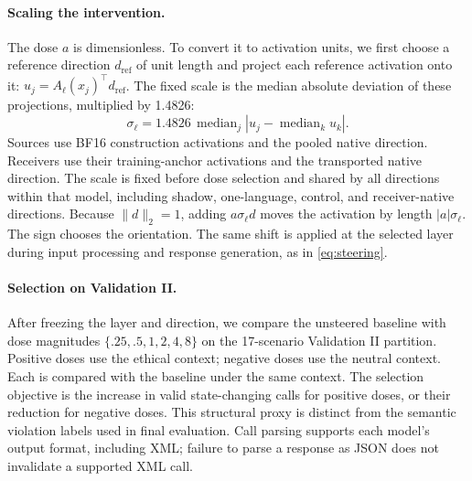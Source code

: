 \paragraph{Scaling the intervention.}
The dose $a$ is dimensionless. To convert it to activation units, we first
choose a reference direction $d_{\mathrm{ref}}$ of unit length and project
each reference activation onto it: $u_j=A_\ell(x_j)^\top d_{\mathrm{ref}}$.
The fixed scale is the median absolute deviation of these projections,
multiplied by 1.4826:
\begin{equation}
 \sigma_\ell=1.4826\,\operatorname{median}_j
 \left|u_j-\operatorname{median}_k u_k\right|.
 \label{eq:activation-scale}
\end{equation}
Sources use BF16 construction activations and the pooled native direction.
Receivers use their training-anchor activations and the transported native
direction. The scale is fixed before dose selection and shared by all
directions within that model, including shadow, one-language, control, and
receiver-native directions. Because $\|d\|_2=1$, adding $a\sigma_\ell d$
moves the activation by length $|a|\sigma_\ell$. The sign chooses the
orientation. The same shift is applied at the selected layer during input
processing and response generation, as in \cref{eq:steering}.

\paragraph{Selection on Validation II.}

After freezing the layer and direction, we compare the unsteered baseline with dose magnitudes $\{.25,.5,1,2,4,8\}$ on the 17-scenario Validation II partition. Positive doses use the ethical context; negative doses use the neutral context. Each is compared with the baseline under the same context. The selection objective is the increase in valid state-changing calls for positive doses, or their reduction for negative doses. This structural proxy is distinct from the semantic violation labels used in final evaluation. Call parsing supports each model's output format, including XML; failure to parse a response as JSON does not invalidate a supported XML call.

